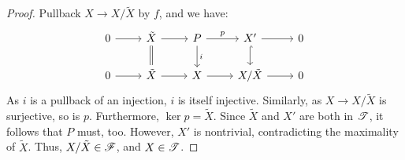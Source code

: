\begin{proof}
Pullback $X \to X/\tilde{X}$ by $f$, and we have:
\[
\begin{tikzcd}
0 \arrow{r} &
\tilde{X} \arrow{r}\arrow[equals]{d} &
P \arrow{r}{p} \arrow{d}{i} &
X' \arrow{r} \arrow[hook]{d} &
0 \\
0 \arrow{r} &
\tilde{X} \arrow{r} &
X \arrow{r} &
X/\tilde{X} \arrow{r} &
0
\end{tikzcd}
\]
As $i$ is a pullback of an injection, $i$ is itself injective.
Similarly, as $X \to X/\tilde{X}$ is surjective, so is $p$.
Furthermore, $\ker p = \tilde{X}$. Since $\tilde{X}$ and $X'$
are both in $\mathscr{T}$, it follows that $P$ must, too. However,
$X'$ is nontrivial, contradicting the maximality of $\tilde{X}$.
Thus, $X/\tilde{X} \in \mathscr{F}$, and $X \in \mathscr{T}$.
\end{proof}
